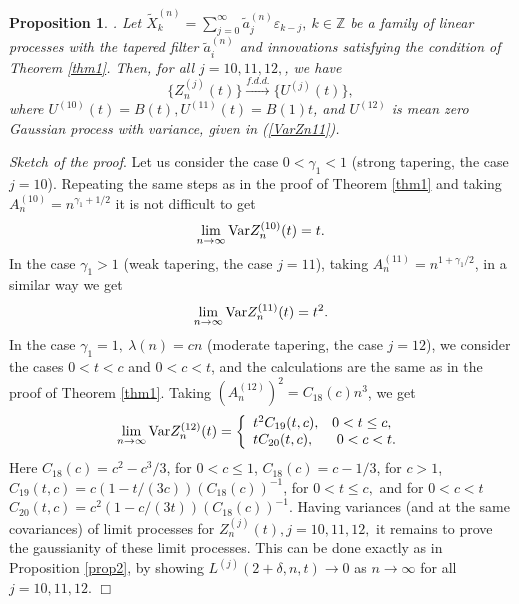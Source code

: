 \documentclass[12pt]{article}
\def\bz{{\bf Z}}
\def\bz{{\mathbb Z}} %
\def\d{\delta}
\def\e{\varepsilon}
\def\g{\gamma}
\def\l{\lambda}
\def\fdd{\stackrel{f.d.d.}{\longrightarrow}}
\newcommand{\halmos}{\vspace{3mm} \hfill \mbox{$\Box$}\\[2mm]}
\theoremstyle{plain}
\newtheorem{prop}[teo]{Proposition}
\theoremstyle{definition}
\begin{document}
\begin{prop}\label{prop3}. Let ${\tilde X}_k^{(n)}=\sum_{j=0}^{\infty} {\tilde a}_{j}^{(n)}\e_{k-j}, \ k\in \bz $ be a family of linear processes with the tapered filter ${\tilde a}_i^{(n)}$ and innovations satisfying the condition of Theorem \ref{thm1}. Then, for all $j=10, 11, 12,$, we have
$$%
\{Z_n^{(j)}(t)\}\fdd \{U^{(j)}(t)\},
$$%
where $U^{(10)}(t)=B(t),  U^{(11)}(t)=B(1)t$, and $ U^{(12)}$ is mean zero Gaussian process with variance, given in (\ref{VarZn11}).
\end{prop}

{\it Sketch of the proof}.
Let  us consider the case $0<\g_1<1$ (strong tapering, the case $j=10$). Repeating the same steps as in the proof of Theorem \ref{thm1} and taking $A_n^{(10)}=n^{\g_1+1/2}$ it is not difficult to get
$$%
\lim_{n\to \infty}{\rm Var}Z_n^{(10)}(t)=t .
$$%
In the case $\g_1>1$ (weak tapering, the case $j=11$), taking $A_n^{(11)}=n^{1+\g_1/2}$, in a similar way we get
$$%
\lim_{n\to \infty}{\rm Var}Z_n^{(11)}(t)=t^2 .
$$%
In the case $\g_1=1,  \ \l(n)=cn$ (moderate tapering, the case $j=12$),  we consider the cases $0<t<c$ and $0<c<t$, and the calculations are the same as in the proof of Theorem \ref{thm1}.
 Taking $\left (A_n^{(12)}\right )^2=C_{18}(c)n^{3}$, we get
\begin{equation*}\label{VarZn11}
\lim_{n\to \infty}{\rm Var}Z_n^{(12)}(t)= \left \{\begin{array}{ll}
t^2 C_{19}(t,c) ,               & 0<t\le c, \\
t C_{20}(t,  c) , & \ 0<c<t.
  \end{array} \right.
\end{equation*}
Here $C_{18}(c)=c^2-c^3/3$, for $0<c\le 1$,  $C_{18}(c)=c-1/3$, for $c > 1$,
$C_{19}(t,  c)=c(1-t/(3c))(C_{18}(c))^{-1}$,  for $0<t\le c,$ and for $0<c< t$
$C_{20}(t,  c)=c^2(1-c/(3t))(C_{18}(c))^{-1}.$
Having variances (and at the same covariances) of limit processes for $Z_n^{(j)}(t), j=10, 11, 12,$ it remains to prove the gaussianity of these limit processes. This can be done exactly as in Proposition  \ref{prop2}, by showing $L^{(j)}(2+\d,n, t) \to 0$ as $n\to \infty$ for all $j=10, 11, 12$.
\halmos
\end{document}
